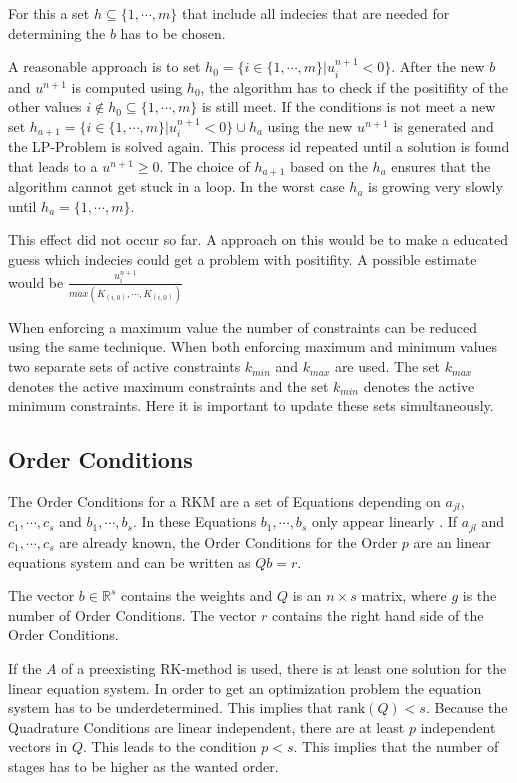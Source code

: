 \documentclass{article}
\begin{document}
For this a set $h \subseteq \{1,\cdots,m \}$ that include all indecies that are needed for determining the $b$ has to be chosen.

A reasonable approach is to set $h_0 = \{ i \in \{1,\cdots,m \} |  u_i^{n+1}  < 0 \}$. 
After the new $b$ and $u^{n+1}$ is computed using $h_0$, the algorithm has to check if the positifity of the other values $i \notin h_0 \subseteq \{1,\cdots,m \}$ is still meet. 
If the conditions is not meet a new set $h_{a+1} = \{ i \in \{1,\cdots,m \}|  u_i^{n+1}  < 0 \} \cup h_{a}$ using the new $u^{n+1}$ is generated and the LP-Problem is solved again. This process id repeated until a solution is found that leads to a $u^{n+1} \geq 0$. The choice of $h_{a+1}$ based on the $h_{a}$ ensures that the algorithm cannot get stuck in a loop. In the worst case $h_a$ is growing very slowly until $h_a = \{1,\cdots,m \}$. 

This effect did not occur so far. A approach on this would be to make a educated guess which indecies could get a problem with positifity. A possible estimate would be $\frac{u_i^{n+1}}{max(K_{(i,0)}, \cdots ,K_{(i,0)})} $ 

When enforcing a maximum value the number of constraints can be reduced using the same technique. When both enforcing maximum and minimum values two separate sets of active constraints $k_{min}$ and $k_{max}$ are used. The set $k_{max}$ denotes the active maximum constraints and the set $k_{min}$ denotes the active minimum constraints. 
Here it is important to update these sets simultaneously.  


\subsection{Order Conditions}\label{sec:OrderCond}

The Order Conditions for a RKM are a set of Equations depending on $a_{jl}$, $c_1,\cdots,c_s$ and $b_1,\cdots,b_s$. In these Equations $b_1,\cdots,b_s$ only appear linearly \cite{hairer_runge-kutta_1993}.
If $a_{jl}$ and $c_1,\cdots,c_s$ are already known, the Order Conditions for the Order $p$ are an linear equations system and can be written as $Q b = r$. 

The vector $b \in \mathbb{R}^s$ contains the weights and $Q$ is an $n \times s$ matrix, where $g$ is the number of Order Conditions. The vector $r$ contains the right hand side of the Order Conditions.

If the $A$ of a  preexisting RK-method is used, there is at least one solution for the linear equation system.
In order to get an optimization problem the equation system has to be underdetermined.
This implies that $\mathrm{rank}(Q) < s$. 
Because the Quadrature Conditions are linear independent, there are at least $p$ independent vectors in $Q$. This leads to the condition $p < s$.
This implies that the number of stages has to be higher as the wanted order.
\end{document}
